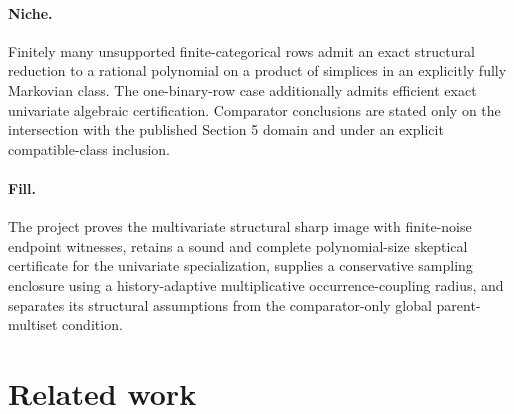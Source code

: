 \documentclass{article}
\begin{document}
\paragraph{Niche.} Finitely many unsupported finite-categorical rows admit an exact structural reduction to a rational polynomial on a product of simplices in an explicitly fully Markovian class. The one-binary-row case additionally admits efficient exact univariate algebraic certification. Comparator conclusions are stated only on the intersection with the published Section 5 domain and under an explicit compatible-class inclusion.

\paragraph{Fill.} The project proves the multivariate structural sharp image with finite-noise endpoint witnesses, retains a sound and complete polynomial-size skeptical certificate for the univariate specialization, supplies a conservative sampling enclosure using a history-adaptive multiplicative occurrence-coupling radius, and separates its structural assumptions from the comparator-only global parent-multiset condition.

\section{Related work}
\end{document}
